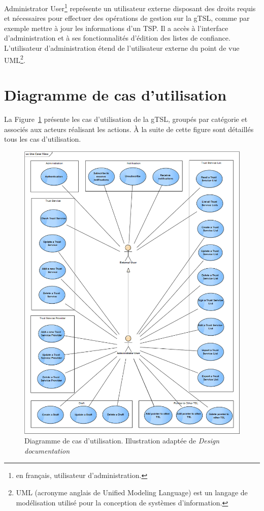 \documentclass{tnreport}
\begin{document}
Administrator User\footnote{en français, utilisateur d'administration.} représente un utilisateur externe disposant des droits requis et nécessaires pour effectuer des opérations de gestion sur la gTSL, comme par exemple mettre à jour les informations d'un TSP. Il a accès à l'interface d'administration et à ses fonctionnalités d'édition des listes de confiance. L'utilisateur d'administration étend de l'utilisateur externe du point de vue UML\footnote{UML (acronyme anglais de Unified Modeling Language) est un langage de modélisation utilisé pour la conception de systèmes d'information.}.

\section{Diagramme de cas d'utilisation}

La Figure~\ref{fig:use-case-diagram} présente les cas d'utilisation de la gTSL, groupés par catégorie et associés aux acteurs réalisant les actions. À la suite de cette figure sont détaillés tous les cas d'utilisation.

\begin{figure}[h]
	\centering
	\includegraphics[scale=0.53]{figures/use-case-diagram}
	\caption{Diagramme de cas d'utilisation. Illustration adaptée de \textit{Design documentation}~\cite{design-document}}
	\label{fig:use-case-diagram}
\end{figure}
\clearpage
\end{document}
